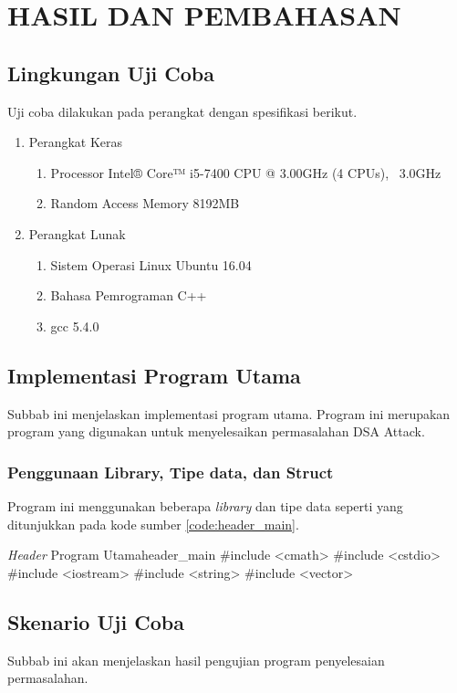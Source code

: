 \chapter{HASIL DAN PEMBAHASAN}

\section{Lingkungan Uji Coba}

Uji coba dilakukan pada perangkat dengan spesifikasi berikut.
\begin{enumerate}
  \item Perangkat Keras
  \begin{enumerate}
    \item Processor Intel® Core™ i5-7400 CPU @ 3.00GHz (4 CPUs), ~3.0GHz
    \item Random Access Memory 8192MB
  \end{enumerate}
  \item Perangkat Lunak
  \begin{enumerate}
    \item Sistem Operasi Linux Ubuntu 16.04
    \item Bahasa Pemrograman C++
    \item gcc 5.4.0
  \end{enumerate}
\end{enumerate}

\section{Implementasi Program Utama}

Subbab ini menjelaskan implementasi program utama. Program ini merupakan program yang digunakan untuk menyelesaikan permasalahan DSA Attack.

\subsection{Penggunaan Library, Tipe data, dan Struct}

Program ini menggunakan beberapa \textit{library} dan tipe data seperti yang ditunjukkan pada kode sumber \ref{code:header_main}.

\begin{code}[firstnumber=1,float]{\textit{Header} Program Utama}{header_main}
#include <cmath>
#include <cstdio>
#include <iostream>
#include <string>
#include <vector>
\end{code}

\section{Skenario Uji Coba}

Subbab ini akan menjelaskan hasil pengujian program penyelesaian permasalahan.